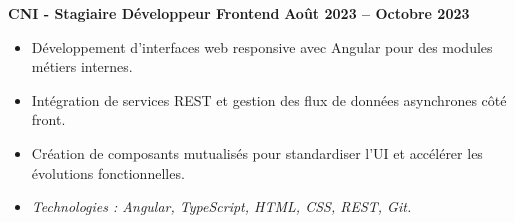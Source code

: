 \documentclass[10pt,a4paper]{article}
\begin{document}
\vspace{6pt}
\textbf{CNI - Stagiaire Développeur Frontend} \hfill \textbf{Août 2023 -- Octobre 2023}
\begin{itemize}
    \item Développement d'interfaces web responsive avec Angular pour des modules métiers internes.
    \item Intégration de services REST et gestion des flux de données asynchrones côté front.
    \item Création de composants mutualisés pour standardiser l'UI et accélérer les évolutions fonctionnelles.
    \item \textit{Technologies : Angular, TypeScript, HTML, CSS, REST, Git.}
\end{itemize}

\end{document}
